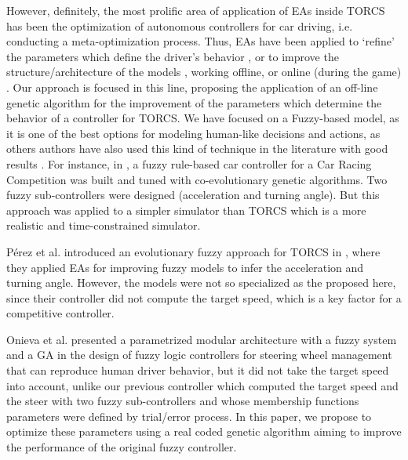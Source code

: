 \documentclass[conference]{IEEEtran}
\begin{document}
However, definitely, the most prolific area of application of EAs
inside TORCS has been the optimization of autonomous controllers for
car driving, i.e. conducting a meta-optimization process. 
Thus, EAs have been applied to `refine' the parameters which define
the driver's behavior \cite{ButzCMAES09,SAES2012}, or to improve the
structure/architecture of the models \cite{evol,neurone}, working
offline, or online (during the game)
\cite{TanOnline08,Cardamone_Online_NN}.
Our approach is focused in this line, proposing the application of an off-line genetic algorithm for the improvement of the parameters which determine the behavior of a controller for TORCS. We have focused on a Fuzzy-based model, as it is one of the best options for modeling human-like decisions and actions, as others authors have also used this kind of technique in the literature with good results \cite{torcs2012}. 
For instance, in \cite{Guadarrama2008}, a fuzzy rule-based car controller for a Car Racing Competition was built and tuned with co-evolutionary genetic algorithms. Two fuzzy sub-controllers were designed (acceleration and turning angle). %
But this approach was applied to a simpler simulator than TORCS which is a more realistic and time-constrained simulator. 

Pérez et al. introduced an evolutionary fuzzy approach for TORCS in \cite{PerezEvolvingFuzzy09}, where they applied EAs for improving fuzzy models to infer the acceleration and turning angle. However, the models were not so specialized as the proposed here, since their controller did not compute the target speed, which is a key factor for a competitive controller. 

Onieva et al. \cite{LFAG} presented a parametrized modular architecture with a fuzzy system and a GA in the design of fuzzy logic controllers for steering wheel management that can reproduce human driver behavior, but it did not take the target speed into account, unlike our previous controller \cite{evo17} which computed the target speed and the steer with two fuzzy sub-controllers and whose membership functions parameters were defined by trial/error process.
In this paper, we propose to optimize these parameters using a real coded genetic algorithm aiming to improve the performance of the original fuzzy controller. %

\end{document}

